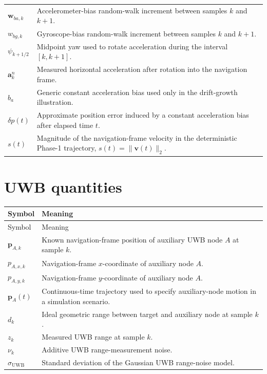 \begin{longtable}{p{}p{}}
$\bm{w}_{ba,k}$ & Accelerometer-bias random-walk increment between samples $k$ and $k+1$.\\
$w_{bg,k}$ & Gyroscope-bias random-walk increment between samples $k$ and $k+1$.\\
$\psi_{k+1/2}$ & Midpoint yaw used to rotate acceleration during the interval $[k,k+1]$.\\
$\bm{a}_k^n$ & Measured horizontal acceleration after rotation into the navigation frame.\\
$b_a$ & Generic constant acceleration bias used only in the drift-growth illustration.\\
$\delta p(t)$ & Approximate position error induced by a constant acceleration bias after elapsed time $t$.\\
$s(t)$ & Magnitude of the navigation-frame velocity in the deterministic Phase-1 trajectory, $s(t)=\lVert\bm{v}(t)\rVert_2$.\\
\bottomrule
\end{longtable}

\section*{UWB quantities}
\begin{longtable}{p{}p{}}
\toprule
Symbol & Meaning\\
\midrule
\endfirsthead
\toprule
Symbol & Meaning\\
\midrule
\endhead
$\bm{p}_{A,k}$ & Known navigation-frame position of auxiliary UWB node $A$ at sample $k$.\\
$p_{A,x,k}$ & Navigation-frame $x$-coordinate of auxiliary node $A$.\\
$p_{A,y,k}$ & Navigation-frame $y$-coordinate of auxiliary node $A$.\\
$\bm{p}_{A}(t)$ & Continuous-time trajectory used to specify auxiliary-node motion in a simulation scenario.\\
$d_k$ & Ideal geometric range between target and auxiliary node at sample $k$.\\
$z_k$ & Measured UWB range at sample $k$.\\
$\nu_k$ & Additive UWB range-measurement noise.\\
$\sigma_{\mathrm{UWB}}$ & Standard deviation of the Gaussian UWB range-noise model.\\
\bottomrule
\end{longtable}

